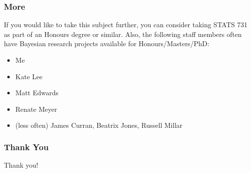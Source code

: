 \documentclass{beamer}
\begin{document}
\begin{frame}
\frametitle{More}
If you would like to take this subject further,
you can consider taking STATS 731 as part of an Honours degree or similar.
Also, the following staff members often have Bayesian research projects available
for Honours/Masters/PhD:
\begin{itemize}
\item Me
\item Kate Lee
\item Matt Edwards
\item Renate Meyer
\item (less often) James Curran, Beatrix Jones, Russell Millar
\end{itemize}

\end{frame}



\begin{frame}
\frametitle{Thank You}
\centering
\large
Thank you!

\end{frame}
\end{document}
